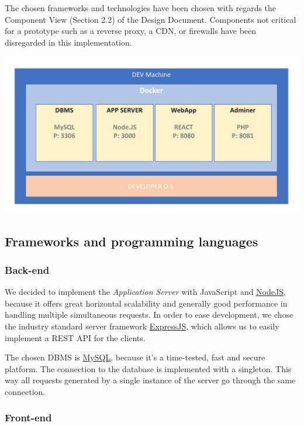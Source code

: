 \documentclass[
]{article}
\begin{document}
The chosen frameworks and technologies have been chosen with regards the
Component View (Section 2.2) of the Design Document. Components not critical for a prototype such as a reverse proxy, a CDN, or firewalls have been disregarded in this implementation.

\includegraphics[width=\textwidth]{images/demo_machine.jpg}


\hypertarget{frameworks-and-programming-languages}{%
\subsection{Frameworks and programming
languages}\label{frameworks-and-programming-languages}}



\hypertarget{back-end}{%
\subsubsection{Back-end}\label{back-end}}

We decided to implement the \emph{Application Server} with JavaScript
and \href{https://nodejs.org}{NodeJS}, because it offers great
horizontal scalability and generally good performance in handling
multiple simultaneous requests. In order to ease development, we chose
the industry standard server framework
\href{https://expressjs.com/}{ExpressJS}, which allows us to easily
implement a REST API for the clients.

The chosen DBMS is \href{https://www.mysql.com/}{MySQL}, because it's a
time-tested, fast and secure platform. The connection to the database is implemented with a singleton. This way all requests generated by a single instance of the server go through the same connection.

\hypertarget{front-end}{%
\subsubsection{Front-end}\label{front-end}}
\end{document}
